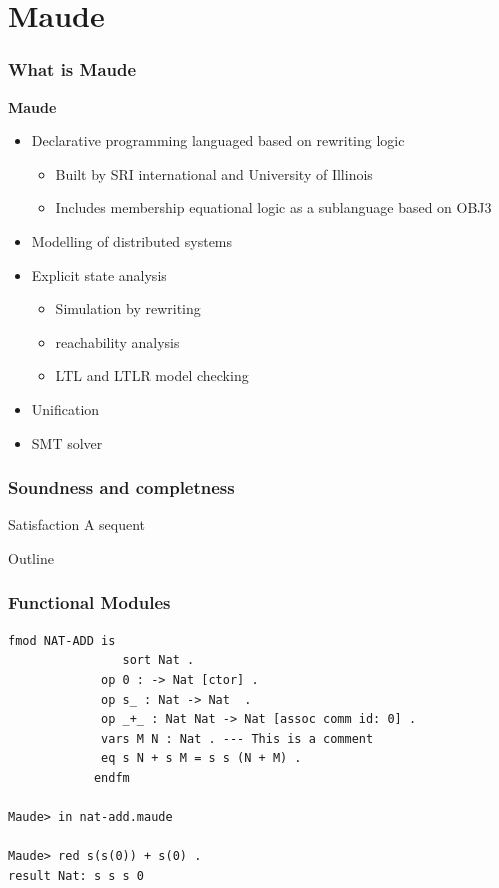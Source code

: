 \documentclass{beamer}
\begin{document}
\section{Maude}
\begin{frame}
    \frametitle{What is Maude}
    \textbf{Maude}
    \begin{itemize}
        \pause
        \item Declarative programming languaged based on rewriting logic 
        \begin{itemize}
            \item Built by SRI international and University of Illinois
            \item Includes membership equational logic as a sublanguage based on OBJ3 
        \end{itemize}
        \pause
        \item Modelling of distributed systems 
        \pause 
        \item  Explicit state analysis 
        \begin{itemize}
            \item Simulation by rewriting 
            \item reachability analysis 
            \item LTL and LTLR model checking 
        \end{itemize}
        \pause 
        \item Unification 
        \item SMT solver
    \end{itemize}
\end{frame}
\begin{frame}
    \frametitle{Soundness and completness}

    \begin{block}{Satisfaction}
        A sequent 
    \end{block}
    

\end{frame}
\begin{frame}{Outline}
\end{frame}
\begin{frame}[fragile]
    \frametitle{Functional Modules}
    \begin{lstlisting}[language=maude]
            fmod NAT-ADD is
                sort Nat .
             op 0 : -> Nat [ctor] .
             op s_ : Nat -> Nat  .
             op _+_ : Nat Nat -> Nat [assoc comm id: 0] .
             vars M N : Nat . --- This is a comment
             eq s N + s M = s s (N + M) .
            endfm

Maude> in nat-add.maude 

Maude> red s(s(0)) + s(0) .
result Nat: s s s 0

    \end{lstlisting}
\end{frame}
\end{document}
